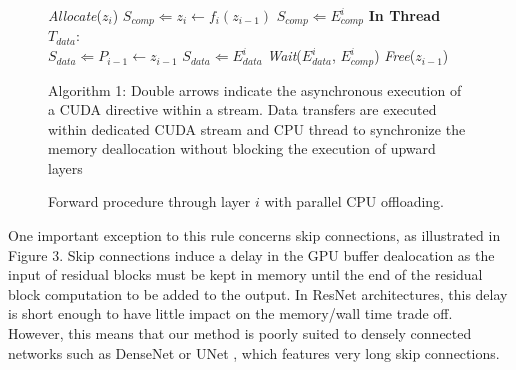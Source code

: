 \documentclass[11pt,onecolumn]{article}
\begin{document}
\begin{figure}[h]
\begin{algorithm}[H]
\vspace{1mm}
\vspace{1mm}
    \textit{Allocate}($z_i$)\;
	$S_{comp} \Leftarrow z_i \leftarrow f_i(z_{i-1})$\;
	$S_{comp} \Leftarrow E_{comp}^i$\;
\vspace{1mm}
	\textbf{In Thread}  $T_{data}$:\\
		\hspace{1.1cm} 	$S_{data} \Leftarrow P_{i-1} \leftarrow z_{i-1}$\;
		\hspace{1.1cm}  $S_{data} \Leftarrow E_{data}^i$\;
		\hspace{1.1cm}  \textit{Wait}($E_{data}^i$, $E_{comp}^i$)\;
		\hspace{1.1cm}  \textit{Free}($z_{i-1}$)\;
	\caption{Forward procedure through layer $i$ with parallel CPU offloading. }
\end{algorithm}
\small{Algorithm 1: Double arrows indicate the asynchronous execution of a CUDA directive within a stream.
Data transfers are executed within dedicated CUDA stream and CPU thread to
synchronize the memory deallocation without blocking the execution of upward layers}
\end{figure}


One important exception to this rule concerns skip connections, as illustrated in Figure 3.
Skip connections induce a delay in the GPU buffer dealocation as the input of residual blocks must
be kept in memory until the end of the residual block computation to be added to the output.
In ResNet architectures, this delay is short enough to have little impact on the memory/wall time trade off.
However, this means that our method is poorly suited to densely connected 
networks such as DenseNet \cite{huang2017densely} or UNet \cite{ronneberger2015u}, which features very long skip connections.
\end{document}
